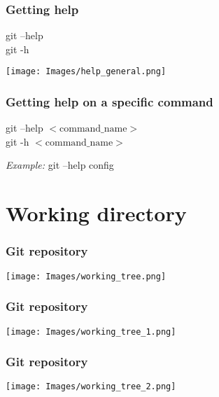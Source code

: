 \documentclass{beamer}
\begin{document}
	\begin{frame}[plain]
		\frametitle{Getting help}
		
		\begin{center}
			git --help  \\
			git -h
		\end{center}
		\begin{center}
			\texttt{[image: Images/help\_general.png]}
		\end{center}
	
	\end{frame}

	\begin{frame}[plain]
		\frametitle{Getting help on a specific command}
		
		\begin{center}
			git --help $<\text{command\_name}>$ \\
			git -h $<\text{command\_name}>$
		\end{center}
		
		\textit{Example:} git --help config
	
	\end{frame}

	\section{Working directory}
    \begin{frame}[plain]
		\frametitle{Git repository}

		\begin{center}
			\texttt{[image: Images/working\_tree.png]}
		\end{center}
	\end{frame}

	\begin{frame}[plain]
		\frametitle{Git repository}

		\begin{center}
			\texttt{[image: Images/working\_tree\_1.png]}
		\end{center}
	\end{frame}	

	\begin{frame}[plain]
		\frametitle{Git repository}

		\begin{center}
			\texttt{[image: Images/working\_tree\_2.png]}
		\end{center}
	\end{frame}	
	
\end{document}
